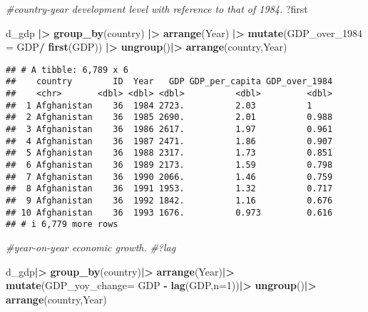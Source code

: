 \documentclass[
]{article}
\newenvironment{Shaded}{\begin{snugshade}}{\end{snugshade}}
\newcommand{\AttributeTok}[1]{\textcolor[rgb]{0.13,0.29,0.53}{#1}}
\newcommand{\CommentTok}[1]{\textcolor[rgb]{0.56,0.35,0.01}{\textit{#1}}}
\newcommand{\DecValTok}[1]{\textcolor[rgb]{0.00,0.00,0.81}{#1}}
\newcommand{\FunctionTok}[1]{\textcolor[rgb]{0.13,0.29,0.53}{\textbf{#1}}}
\newcommand{\NormalTok}[1]{#1}
\newcommand{\SpecialCharTok}[1]{\textcolor[rgb]{0.81,0.36,0.00}{\textbf{#1}}}
\begin{document}
\begin{Shaded}
\begin{Highlighting}[]
\CommentTok{\#country{-}year development level with reference to that of 1984.}
\NormalTok{?first}
\end{Highlighting}
\end{Shaded}

\begin{Shaded}
\begin{Highlighting}[]
\NormalTok{d\_gdp }\SpecialCharTok{|\textgreater{}}
  \FunctionTok{group\_by}\NormalTok{(country) }\SpecialCharTok{|\textgreater{}}
  \FunctionTok{arrange}\NormalTok{(Year) }\SpecialCharTok{|\textgreater{}}
  \FunctionTok{mutate}\NormalTok{(}\AttributeTok{GDP\_over\_1984 =}\NormalTok{ GDP}\SpecialCharTok{/} \FunctionTok{first}\NormalTok{(GDP)) }\SpecialCharTok{|\textgreater{}}
  \FunctionTok{ungroup}\NormalTok{()}\SpecialCharTok{|\textgreater{}}
  \FunctionTok{arrange}\NormalTok{(country,Year)}
\end{Highlighting}
\end{Shaded}

\begin{verbatim}
## # A tibble: 6,789 x 6
##    country        ID  Year   GDP GDP_per_capita GDP_over_1984
##    <chr>       <dbl> <dbl> <dbl>          <dbl>         <dbl>
##  1 Afghanistan    36  1984 2723.          2.03          1    
##  2 Afghanistan    36  1985 2690.          2.01          0.988
##  3 Afghanistan    36  1986 2617.          1.97          0.961
##  4 Afghanistan    36  1987 2471.          1.86          0.907
##  5 Afghanistan    36  1988 2317.          1.73          0.851
##  6 Afghanistan    36  1989 2173.          1.59          0.798
##  7 Afghanistan    36  1990 2066.          1.46          0.759
##  8 Afghanistan    36  1991 1953.          1.32          0.717
##  9 Afghanistan    36  1992 1842.          1.16          0.676
## 10 Afghanistan    36  1993 1676.          0.973         0.616
## # i 6,779 more rows
\end{verbatim}

\begin{Shaded}
\begin{Highlighting}[]
\CommentTok{\#year{-}on{-}year economic growth.}
\CommentTok{\#?lag}

\NormalTok{d\_gdp}\SpecialCharTok{|\textgreater{}}
  \FunctionTok{group\_by}\NormalTok{(country)}\SpecialCharTok{|\textgreater{}}
  \FunctionTok{arrange}\NormalTok{(Year)}\SpecialCharTok{|\textgreater{}}
  \FunctionTok{mutate}\NormalTok{(}\AttributeTok{GDP\_yoy\_change=}\NormalTok{ GDP }\SpecialCharTok{{-}} \FunctionTok{lag}\NormalTok{(GDP,}\AttributeTok{n=}\DecValTok{1}\NormalTok{))}\SpecialCharTok{|\textgreater{}}
  \FunctionTok{ungroup}\NormalTok{()}\SpecialCharTok{|\textgreater{}}
  \FunctionTok{arrange}\NormalTok{(country,Year)}
\end{Highlighting}
\end{Shaded}
\end{document}
